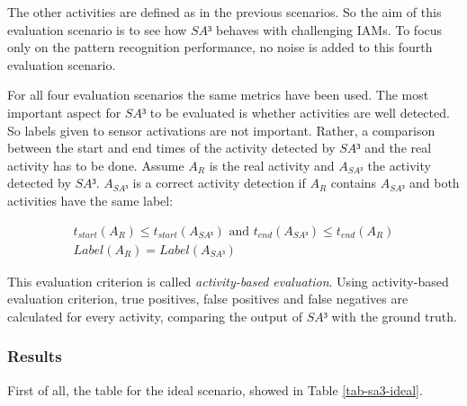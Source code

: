 The other activities are defined as in the previous scenarios. So the aim of this evaluation scenario is to see how $SA³$ behaves with challenging IAMs. To focus only on the pattern recognition performance, no noise is added to this fourth evaluation scenario.

For all four evaluation scenarios the same metrics have been used. The most important aspect for $SA³$ to be evaluated is whether activities are well detected. So labels given to sensor activations are not important. Rather, a comparison between the start and end times of the activity detected by $SA³$ and the real activity has to be done. Assume $A_R$ is the real activity and $A_{SA³}$ the activity detected by $SA³$. $A_{SA³}$ is a correct activity detection if $A_R$ contains $A_{SA³}$ and both activities have the same label:

\begin{equation}
\begin{gathered}
 t_{start}(A_R) \leq t_{start}(A_{SA³}) \mbox{ and } t_{end}(A_{SA³}) \leq t_{end}(A_R) \\
 Label(A_R) = Label(A_{SA³})
\end{gathered}
\label{metric-sa3}
\end{equation}

This evaluation criterion is called \textit{activity-based evaluation}. Using activity-based evaluation criterion, true positives, false positives and false negatives are calculated for every activity, comparing the output of $SA³$ with the ground truth.






\subsubsection{Results}
\label{subsubsec:evaluation:sa3:results}

First of all, the table for the ideal scenario, showed in Table \ref{tab-sa3-ideal}.

